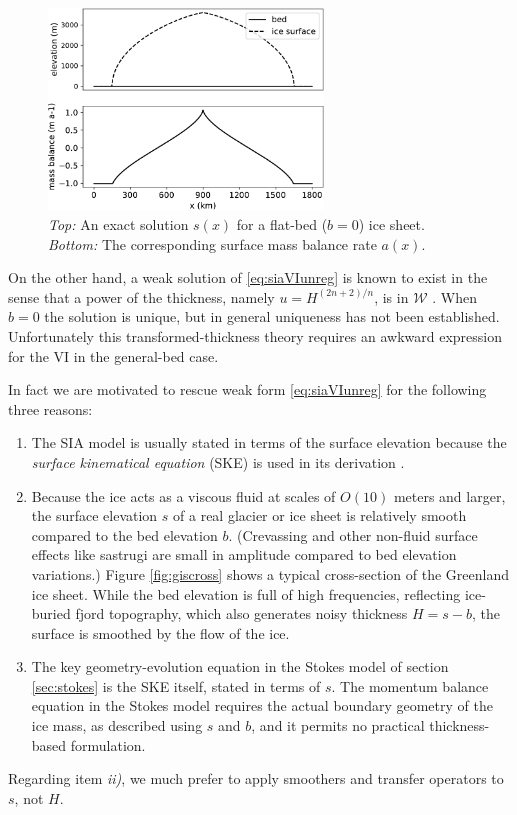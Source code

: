 \documentclass[letterpaper,final,12pt,reqno]{amsart}
\theoremstyle{claim}
\numberwithin{equation}{section}
\numberwithin{figure}{section}
\numberwithin{table}{section}
\numberwithin{theorem}{section}
\begin{document}
\begin{figure}
\includegraphics[width=0.65\textwidth]{fixfigs/siadatafigure.pdf}
\caption{\emph{Top:} An exact solution $s(x)$ for a flat-bed ($b=0$) ice sheet.  \emph{Bottom:} The corresponding surface mass balance rate $a(x)$.}
\label{fig:siadatafigure}
\end{figure}

On the other hand, a weak solution of \eqref{eq:siaVIunreg} is known to exist in the sense that a power of the thickness, namely $u=H^{(2n+2)/n}$, is in $\mathcal{W}$ \cite{JouvetBueler2012}.  When $b=0$ the solution is unique, but in general uniqueness has not been established.  Unfortunately this transformed-thickness theory requires an awkward expression for the VI in the general-bed case.

In fact we are motivated to rescue weak form \eqref{eq:siaVIunreg} for the following three reasons:
\begin{enumerate}
\item The SIA model is usually stated in terms of the surface elevation because the \emph{surface kinematical equation} (SKE) is used in its derivation \cite{GreveBlatter2009}.
\item Because the ice acts as a viscous fluid at scales of $O(10)$ meters and larger, the surface elevation $s$ of a real glacier or ice sheet is relatively smooth compared to the bed elevation $b$.  (Crevassing and other non-fluid surface effects like sastrugi are small in amplitude compared to bed elevation variations.)  Figure \ref{fig:giscross} shows a typical cross-section of the Greenland ice sheet.  While the bed elevation is full of high frequencies, reflecting ice-buried fjord topography, which also generates noisy thickness $H=s-b$, the surface is smoothed by the flow of the ice.
\item The key geometry-evolution equation in the Stokes model of section \ref{sec:stokes} is the SKE itself, stated in terms of $s$.  The momentum balance equation in the Stokes model requires the actual boundary geometry of the ice mass, as described using $s$ and $b$, and it permits no practical thickness-based formulation.
\end{enumerate}
Regarding item \emph{ii)}, we much prefer to apply smoothers and transfer operators to $s$, not $H$.
\end{document}
